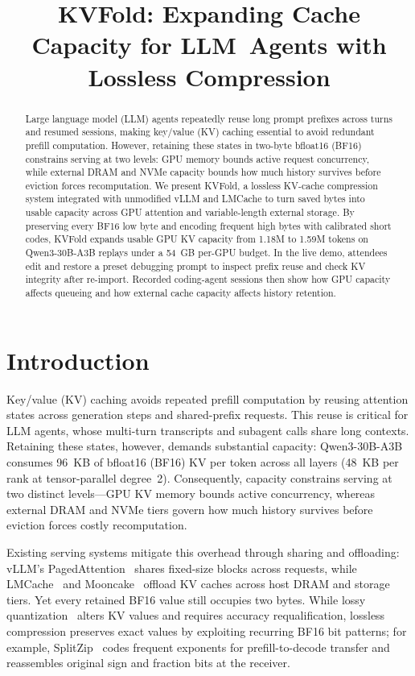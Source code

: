 \documentclass[conference]{IEEEtran}
\title{KVFold: Expanding Cache Capacity for \mbox{LLM Agents} with Lossless Compression}
\author{\IEEEauthorblockN{Working draft}
\IEEEauthorblockA{Author information to be supplied}}
\begin{document}
\maketitle

\begin{abstract}
Large language model (LLM) agents repeatedly reuse long prompt prefixes across
turns and resumed sessions, making key/value (KV) caching essential to avoid
redundant prefill computation. However, retaining these states in two-byte
bfloat16 (BF16) constrains serving at two levels: GPU memory bounds active
request concurrency, while external DRAM and NVMe capacity bounds how much
history survives before eviction forces recomputation. We present KVFold, a
lossless KV-cache compression system integrated with unmodified vLLM and
LMCache to turn saved bytes into usable capacity across GPU attention and
variable-length external storage. By preserving every BF16 low byte and
encoding frequent high bytes with calibrated short codes, KVFold expands
usable GPU KV capacity from 1.18M to 1.59M tokens on Qwen3-30B-A3B replays
under a 54~GB per-GPU budget. In the live demo, attendees edit and restore a
preset debugging prompt to inspect prefix reuse and check KV integrity after
re-import. Recorded coding-agent sessions then show how GPU capacity affects
queueing and how external cache capacity affects history retention.
\end{abstract}

\section{Introduction}
Key/value (KV) caching avoids repeated prefill computation by reusing attention
states across generation steps and shared-prefix requests. This reuse is
critical for LLM agents, whose multi-turn transcripts and subagent calls share
long contexts. Retaining these states, however, demands substantial capacity:
Qwen3-30B-A3B consumes 96~KB of bfloat16 (BF16) KV per token across all layers
(48~KB per rank at tensor-parallel degree~2). Consequently, capacity constrains
serving at two distinct levels---GPU KV memory bounds active concurrency,
whereas external DRAM and NVMe tiers govern how much history survives before
eviction forces costly recomputation.

Existing serving systems mitigate this overhead through sharing and offloading:
vLLM's PagedAttention~\cite{vllm} shares fixed-size blocks across requests,
while LMCache~\cite{lmcache} and Mooncake~\cite{mooncake} offload KV caches
across host DRAM and storage tiers. Yet every retained
BF16 value still occupies two bytes. While lossy quantization~\cite{kivi}
alters KV values and requires accuracy requalification, lossless compression
preserves exact values by exploiting recurring BF16 bit patterns; for example,
SplitZip~\cite{splitzip} codes frequent exponents for prefill-to-decode
transfer and reassembles original sign and fraction bits at the receiver.
\end{document}
